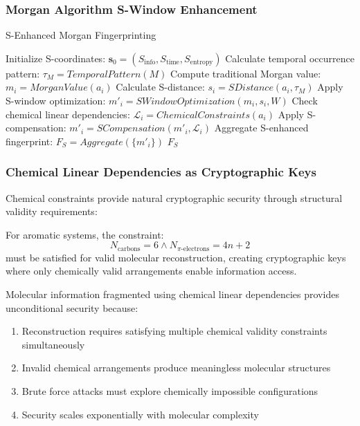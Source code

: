 ﻿\documentclass[11pt,a4paper]{article}
\begin{document}
\subsubsection{Morgan Algorithm S-Window Enhancement}

\begin{algorithm}
\caption{S-Enhanced Morgan Fingerprinting}
\begin{algorithmic}
    \State Initialize S-coordinates: $\mathbf{s}_0 = (S_{\text{info}}, S_{\text{time}}, S_{\text{entropy}})$
    \State Calculate temporal occurrence pattern: $\tau_M = TemporalPattern(M)$
        \State Compute traditional Morgan value: $m_i = MorganValue(a_i)$
        \State Calculate S-distance: $s_i = SDistance(a_i, \tau_M)$
        \State Apply S-window optimization: $m'_i = SWindowOptimization(m_i, s_i, W)$
        \State Check chemical linear dependencies: $\mathcal{L}_i = ChemicalConstraints(a_i)$
            \State Apply S-compensation: $m'_i = SCompensation(m'_i, \mathcal{L}_i)$
        \EndIf
    \EndFor
    \State Aggregate S-enhanced fingerprint: $F_S = Aggregate(\{m'_i\})$
    \State \Return $F_S$
\EndProcedure
\end{algorithmic}
\end{algorithm}

\subsubsection{Chemical Linear Dependencies as Cryptographic Keys}

Chemical constraints provide natural cryptographic security through structural validity requirements:

\begin{definition}
For aromatic systems, the constraint:
\begin{equation}
N_{\text{carbons}} = 6 \land N_{\pi\text{-electrons}} = 4n+2
\end{equation}
must be satisfied for valid molecular reconstruction, creating cryptographic keys where only chemically valid arrangements enable information access.
\end{definition}

\begin{theorem}
Molecular information fragmented using chemical linear dependencies provides unconditional security because:
\begin{enumerate}
\item Reconstruction requires satisfying multiple chemical validity constraints simultaneously
\item Invalid chemical arrangements produce meaningless molecular structures
\item Brute force attacks must explore chemically impossible configurations
\item Security scales exponentially with molecular complexity
\end{enumerate}
\end{theorem}
\end{document}
